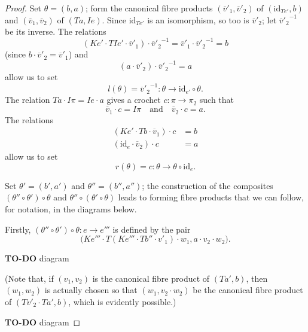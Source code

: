 \documentclass[fleqn]{article}
\newcommand{\oldpage}[1]{\marginpar{\footnotesize$\Big\vert$ \textit{p.~#1}}}
\newcommand{\todo}{{\color{purple}\textbf{TO-DO }}}
\newcommand{\id}{\mathrm{id}}
\newcommand{\textand}{\quad\text{and}\quad}
\begin{document}
\begin{proof}
  Set $\theta=(b,a)$;
  form the canonical fibre products $(\overline{v}'_1,\overline{v}'_2)$ of $(\id_{Te'},b)$ and $(\overline{v}_1,\overline{v}_2)$ of $(Ta,Ie)$.
  Since $\id_{Te'}$ is an isomorphism, so too is $\overline{v}'_2$;
  let ${\overline{v}'_2}^{-1}$ be its inverse.
  The relations
  \[
    (Ke'\cdot TIe'\cdot\overline{v}'_1)\cdot{\overline{v}'_2}^{-1}
    = \overline{v}'_1\cdot{\overline{v}'_2}^{-1}
    = b
  \]
  (since $b\cdot\overline{v}'_2=\overline{v}'_1$) and
  \[
    (a\cdot\overline{v}'_2)\cdot{\overline{v}'_2}^{-1}
    = a
  \]
  allow us to set
  \[
    l(\theta)
    = {\overline{v}'_2}^{-1}
    \colon\theta
    \to \id_{e'}\circ\theta.
  \]
  The relation $Ta\cdot I\pi=Ie\cdot a$ gives a crochet $c\colon\pi\to\pi_2$ such that
  \[
    \overline{v}_1\cdot c = I\pi
    \textand
    \overline{v}_2\cdot c = a.
  \]
  The relations
  \[
    \begin{aligned}
      (Ke'\cdot Tb\cdot\overline{v}_1)\cdot c
      &= b
    \\(\id_e\cdot\overline{v}_2)\cdot c
      &= a
    \end{aligned}
  \]
  allow us to set
  \[
    r(\theta)
    = c
    \colon\theta
    \to\theta\circ\id_e.
  \]

  Set $\theta'=(b',a')$ and $\theta''=(b'',a'')$;
  the construction of the composites $(\theta''\circ\theta')\circ\theta$ and $\theta''\circ(\theta'\circ\theta)$ leads to forming fibre products that we can follow, for notation, in the diagrams below.

  \oldpage{250}
  Firstly, $(\theta''\circ\theta')\circ\theta\colon e\to e'''$ is defined by the pair
  \[
    \big(
      Ke'''\cdot T(Ke'''\cdot Tb''\cdot v'_1)\cdot w_1,
      a\cdot v_2\cdot w_2
    \big).
  \]

  \todo{diagram}

  (Note that, if $(v_1,v_2)$ is the canonical fibre product of $(Ta',b)$, then $(w_1,w_2)$ is actually chosen so that $(w_1,v_2\cdot w_2)$ be the canonical fibre product of $(Tv'_2\cdot Ta',b)$, which is evidently possible.)

  \todo{diagram}


\end{proof}
\end{document}
